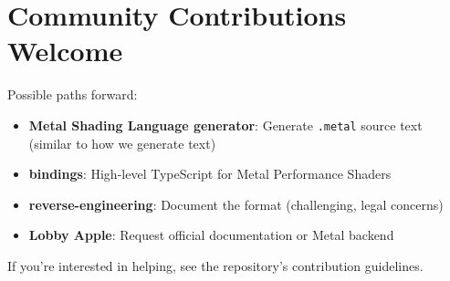 \section{Community Contributions Welcome}

Possible paths forward:
\begin{itemize}[noitemsep]
  \item \textbf{Metal Shading Language generator}: Generate \texttt{.metal} source text (similar to how we generate   text)
  \item \textbf{ bindings}: High-level TypeScript  for Metal Performance Shaders
  \item \textbf{ reverse-engineering}: Document the format (challenging, legal concerns)
  \item \textbf{Lobby Apple}: Request official  documentation or  Metal backend
\end{itemize}

If you're interested in helping, see the repository's contribution guidelines.

\backmatter

